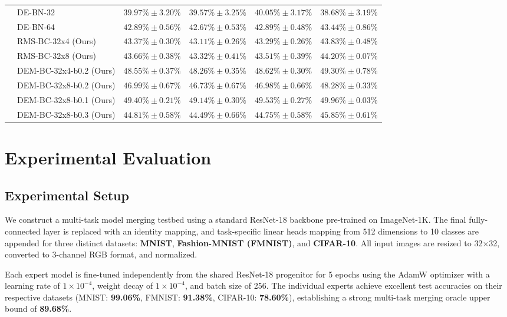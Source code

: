 \documentclass{article}
\begin{document}
\begin{table}[t]
\begin{center}
\begin{small}
\begin{sc}
\begin{tabular}{llcccc}
& DE-BN-32 & $39.97\% \pm 3.20\%$ & $39.57\% \pm 3.25\%$ & $40.05\% \pm 3.17\%$ & $38.68\% \pm 3.19\%$ \\
& DE-BN-64 & $42.89\% \pm 0.56\%$ & $42.67\% \pm 0.53\%$ & $42.89\% \pm 0.48\%$ & $43.44\% \pm 0.86\%$ \\
\cmidrule{2-6}
& RMS-BC-32x4 (Ours) & $43.37\% \pm 0.30\%$ & $43.11\% \pm 0.26\%$ & $43.29\% \pm 0.26\%$ & $43.83\% \pm 0.48\%$ \\
& RMS-BC-32x8 (Ours) & $43.66\% \pm 0.38\%$ & $43.32\% \pm 0.41\%$ & $43.51\% \pm 0.39\%$ & $44.20\% \pm 0.07\%$ \\
& DEM-BC-32x4-b0.2 (Ours) & $48.55\% \pm 0.37\%$ & $48.26\% \pm 0.35\%$ & $48.62\% \pm 0.30\%$ & $49.30\% \pm 0.78\%$ \\
& DEM-BC-32x8-b0.2 (Ours) & $46.99\% \pm 0.67\%$ & $46.73\% \pm 0.67\%$ & $46.98\% \pm 0.66\%$ & $48.28\% \pm 0.33\%$ \\
& DEM-BC-32x8-b0.1 (Ours) & $\mathbf{49.40\% \pm 0.21\%}$ & $\mathbf{49.14\% \pm 0.30\%}$ & $\mathbf{49.53\% \pm 0.27\%}$ & $\mathbf{49.96\% \pm 0.03\%}$ \\
& DEM-BC-32x8-b0.3 (Ours) & $44.81\% \pm 0.58\%$ & $44.49\% \pm 0.66\%$ & $44.75\% \pm 0.58\%$ & $45.85\% \pm 0.61\%$ \\
\bottomrule
\end{tabular}
\end{sc}
\end{small}
\end{center}
\vskip -0.1in
\end{table}

\section{Experimental Evaluation}
\subsection{Experimental Setup}
We construct a multi-task model merging testbed using a standard ResNet-18 backbone pre-trained on ImageNet-1K. The final fully-connected layer is replaced with an identity mapping, and task-specific linear heads mapping from 512 dimensions to 10 classes are appended for three distinct datasets: \textbf{MNIST}, \textbf{Fashion-MNIST (FMNIST)}, and \textbf{CIFAR-10}. All input images are resized to 32$\times$32, converted to 3-channel RGB format, and normalized.

Each expert model is fine-tuned independently from the shared ResNet-18 progenitor for 5 epochs using the AdamW optimizer with a learning rate of $1 \times 10^{-4}$, weight decay of $1 \times 10^{-4}$, and batch size of 256. The individual experts achieve excellent test accuracies on their respective datasets (MNIST: \textbf{99.06\%}, FMNIST: \textbf{91.38\%}, CIFAR-10: \textbf{78.60\%}), establishing a strong multi-task merging oracle upper bound of \textbf{89.68\%}.
\end{document}

